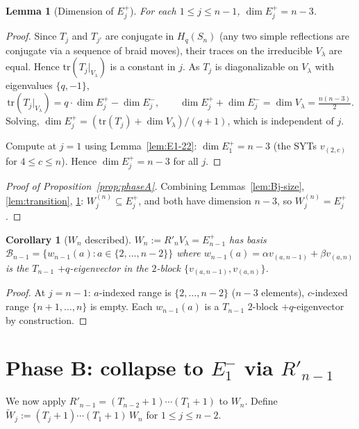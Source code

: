 \documentclass[11pt]{article}
\newtheorem{lemma}[theorem]{Lemma}
\newtheorem{corollary}[theorem]{Corollary}
\theoremstyle{definition}
\begin{document}
\begin{lemma}[Dimension of $E_j^+$]\label{lem:Ej-dim}
For each $1 \le j \le n-1$, $\dim E_j^+ = n - 3$.
\end{lemma}

\begin{proof}
Since $T_j$ and $T_{j'}$ are conjugate in $H_q(S_n)$ (any two simple
reflections are conjugate via a sequence of braid moves), their traces
on the irreducible $V_\lambda$ are equal.  Hence
$\mathrm{tr}(T_j|_{V_\lambda})$ is a constant in $j$.  As $T_j$ is
diagonalizable on $V_\lambda$ with eigenvalues $\{q, -1\}$,
\[
   \mathrm{tr}(T_j|_{V_\lambda})
   = q\cdot\dim E_j^+ - \dim E_j^-,
   \qquad
   \dim E_j^+ + \dim E_j^- = \dim V_\lambda = \tfrac{n(n-3)}{2}.
\]
Solving, $\dim E_j^+ = (\mathrm{tr}(T_j) + \dim V_\lambda)/(q + 1)$,
which is independent of $j$.

Compute at $j = 1$ using Lemma~\ref{lem:E1-22}: $\dim E_1^+ = n - 3$
(the SYTs $v_{(2,c)}$ for $4 \le c \le n$).  Hence $\dim E_j^+ = n-3$
for all $j$.
\end{proof}

\begin{proof}[Proof of Proposition~\ref{prop:phaseA}]
Combining Lemmas~\ref{lem:Bj-size}, \ref{lem:transition},
\ref{lem:Ej-dim}: $W_j^{(n)} \subseteq E_j^+$, and both have dimension
$n-3$, so $W_j^{(n)} = E_j^+$.
\end{proof}

\begin{corollary}[$W_n$ described]\label{cor:Wn}
$W_n := R'_n V_\lambda = E_{n-1}^+$ has basis
$\mathcal{B}_{n-1} = \{w_{n-1}(a) : a \in \{2,\ldots,n-2\}\}$
where $w_{n-1}(a) = \alpha v_{(a,n-1)} + \beta v_{(a,n)}$ is the
$T_{n-1}$ $+q$-eigenvector in the $2$-block
$\{v_{(a,n-1)}, v_{(a,n)}\}$.
\end{corollary}

\begin{proof}
At $j = n-1$: $a$-indexed range is $\{2,\ldots,n-2\}$ ($n-3$ elements),
$c$-indexed range $\{n+1,\ldots,n\}$ is empty.  Each $w_{n-1}(a)$ is
a $T_{n-1}$ $2$-block $+q$-eigenvector by construction.
\end{proof}

\section{Phase B: collapse to $E_1^-$ via $R'_{n-1}$}\label{sec:phaseB}

We now apply $R'_{n-1} = (T_{n-2}{+}1)\cdots(T_1{+}1)$ to $W_n$.
Define $\widetilde{W}_j := (T_j{+}1)\cdots(T_1{+}1)\,W_n$ for
$1 \le j \le n-2$.
\end{document}
